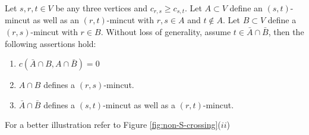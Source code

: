 \begin{lemma}
Let $s,r,t \in V$ be any three vertices and $c_{r,s} \ge c_{s,t}$. Let $A\subset V$ define an $(s,t)$-mincut as well as
an $(r,t)$-mincut
with $r,s\in A$ and $t\notin A$. Let $B\subset V$ define a $(r,s)$-mincut with $r\in B$. Without loss of generality, assume $t \in {\bar A}\cap {\bar B}$, then the following assertions hold:
\begin{enumerate}
\item
$c(\bar{A}\cap B, A\cap \bar{B})=0$
\item  $A\cap B$ defines a $(r,s)$-mincut.
\item  ${\bar A}\cap {\bar B}$ defines a $(s,t)$-mincut as well as a $(r,t)$-mincut.
\end{enumerate}

For a better illustration refer to Figure \ref{fig:non-S-crossing}($ii$) 
\label{lem:3-vertex-lemma}
\end{lemma}
